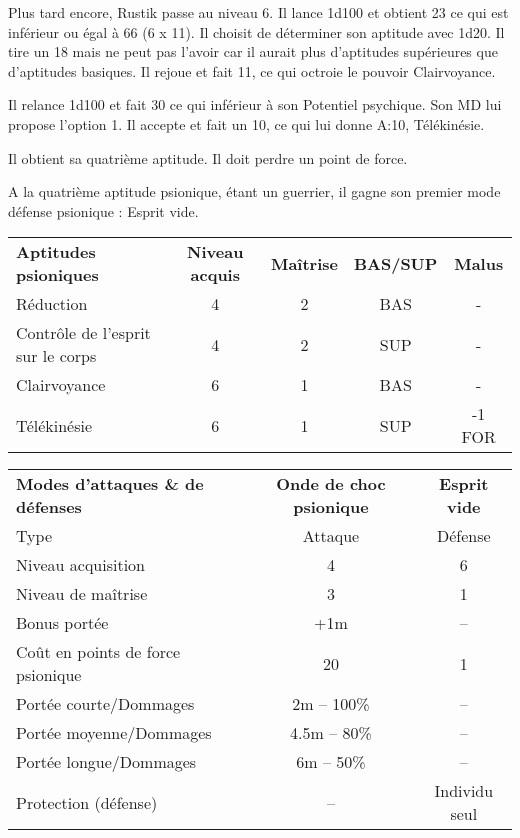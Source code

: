 \bigskip

Plus tard encore, Rustik passe au niveau 6. Il lance 1d100 et obtient 23 ce qui est inférieur ou égal à 66 (6 x 11). Il choisit de déterminer son aptitude avec 1d20. Il tire un 18 mais ne peut pas l'avoir car il aurait plus d'aptitudes supérieures que d'aptitudes basiques. Il rejoue et fait 11, ce qui octroie le pouvoir Clairvoyance.

\bigskip

Il relance 1d100 et fait 30 ce qui inférieur à son Potentiel psychique. Son MD lui propose l'option 1. Il accepte et fait un 10, ce qui lui donne A:10, Télékinésie.

\bigskip

Il obtient sa quatrième aptitude. Il doit perdre un point de force.

\bigskip

A la quatrième aptitude psionique, étant un guerrier, il gagne son premier mode défense psionique : Esprit vide.

\bigskip

\begin{tabular}{lcccc}
\textbf{Aptitudes psioniques} & \textbf{Niveau acquis} & \textbf{Maîtrise}  & \textbf{BAS/SUP} & \textbf{Malus} \\
Réduction                         & 4 & 2 & BAS & - \\
Contrôle de l'esprit sur le corps & 4 & 2 & SUP & - \\
Clairvoyance                      & 6 & 1 & BAS & - \\
Télékinésie                       & 6 & 1 & SUP & -1 FOR\\
\end{tabular}

\bigskip

\begin{tabular}{lcc}
\textbf{Modes d'attaques \& de défenses} & \textbf{Onde de choc psionique} & \textbf{Esprit vide}\\
Type                                & Attaque           & Défense\\
Niveau acquisition                  & 4                 & 6 \\
Niveau de maîtrise                  & 3                 & 1\\
Bonus portée                        & +1m               & --\\
Coût en points de force psionique   & 20                & 1 \\
Portée courte/Dommages              & 2m -- 100\%       & --\\
Portée moyenne/Dommages             & 4.5m -- 80\%      & -- \\
Portée longue/Dommages              & 6m -- 50\%        & --\\
Protection (défense)                & --                & Individu seul \\
\end{tabular}

